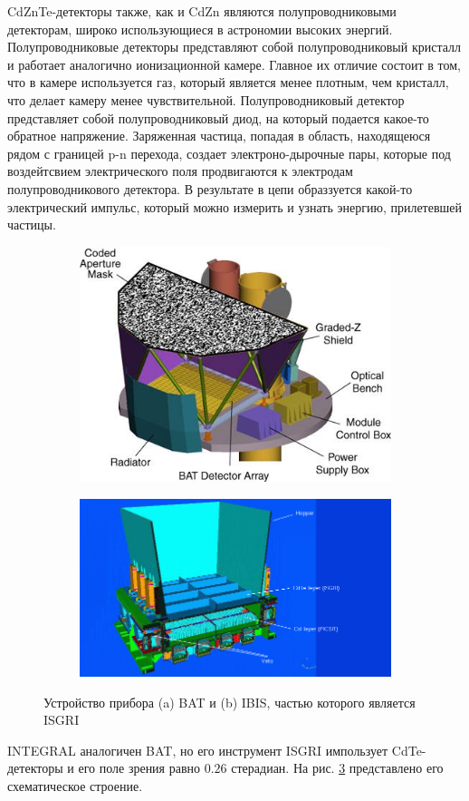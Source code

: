 	 CdZnTe-детекторы также, как и CdZn являются полупроводниковыми детекторам, широко использующиеся в астрономии высоких энергий. Полупроводниковые детекторы представляют собой полупроводниковый кристалл и работает аналогично ионизационной камере. Главное их отличие состоит в том, что в камере используется газ, который является менее плотным, чем кристалл, что делает камеру менее чувствительной. Полупроводниковый детектор представляет собой полупроводниковый диод, на который подается какое-то обратное напряжение. Заряженная частица, попадая в область, находящеюся рядом с границей p-n перехода, создает электроно-дырочные пары, которые под воздейтсвием электрического поля продвигаются к электродам полупроводникового детектора. В результате в цепи образзуется какой-то электрический импульс, который можно измерить и узнать энергию, прилетевшей частицы. 
	
	\begin{figure}[h!]
		\centering
			\begin{subfigure}[b]{0.49\linewidth}
			\includegraphics[width = \textwidth]{pictures/BAT.jpg}
			\caption{}
			\label{img:bat1}
		\end{subfigure}
		\begin{subfigure}[b]{0.49\linewidth}
		\centering
			\includegraphics[width = \textwidth]{pictures/INTEGRAL.png}
			\caption{}
			\label{img:int1}
		\end{subfigure}
		\caption{Устройство прибора (a) BAT и (b) IBIS, частью которого является ISGRI}
	\end{figure}
	
	INTEGRAL аналогичен BAT, но его инструмент ISGRI импользует CdTe-детекторы и его поле зрения равно $0.26$ стерадиан. На рис. \ref{img:int1} представлено его схематическое строение. 
